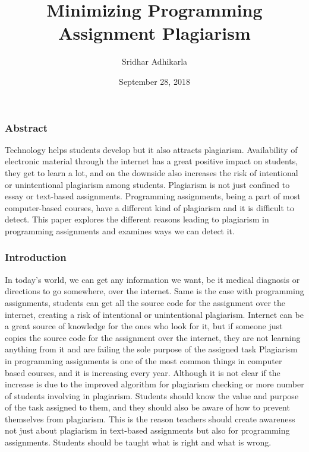 \documentclass[a4paper]{article}
\title{Minimizing Programming Assignment Plagiarism}
\author{Sridhar Adhikarla}
\date{September 28, 2018}
\begin{document}
\maketitle

\subsubsection{Abstract}\label{abstract}

Technology helps students develop but it also attracts plagiarism.
Availability of electronic material through the internet has a great
positive impact on students, they get to learn a lot, and on the
downside also increases the risk of intentional or unintentional
plagiarism among students. Plagiarism is not just confined to essay or
text-based assignments. Programming assignments, being a part of most
computer-based courses, have a different kind of plagiarism and it is
difficult to detect. This paper explores the different reasons leading
to plagiarism in programming assignments and examines ways we can detect
it.

\subsubsection{Introduction}\label{introduction}

In today's world, we can get any information we want, be it medical
diagnosis or directions to go somewhere, over the internet. Same is the
case with programming assignments, students can get all the source code
for the assignment over the internet, creating a risk of intentional or
unintentional plagiarism. Internet can be a great source of knowledge
for the ones who look for it, but if someone just copies the source code
for the assignment over the internet, they are not learning anything
from it and are failing the sole purpose of the assigned task Plagiarism
in programming assignments is one of the most common things in computer
based courses, and it is increasing every year. Although it is not clear
if the increase is due to the improved algorithm for plagiarism checking
or more number of students involving in plagiarism. Students should know
the value and purpose of the task assigned to them, and they should also
be aware of how to prevent themselves from plagiarism. This is the
reason teachers should create awareness not just about plagiarism in
text-based assignments but also for programming assignments. Students
should be taught what is right and what is wrong.
\end{document}
